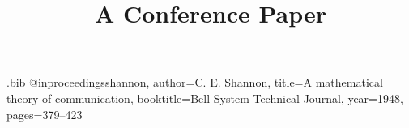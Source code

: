 \begin{filecontents*}[overwrite]{\jobname.bib}
@inproceedings{shannon, author={C. E. Shannon}, title={A mathematical theory of communication},
  booktitle={Bell System Technical Journal}, year={1948}, pages={379--423}}
\end{filecontents*}
\documentclass[conference]{IEEEtran}
\usepackage{cite}
\usepackage{amsmath,amssymb}
\usepackage{algorithmic}
\usepackage{xcolor}

\title{A Conference Paper}
\author{}
\maketitle
\begin{abstract}
A short abstract.
\end{abstract}
\begin{IEEEkeywords}
testing, typesetting
\end{IEEEkeywords}
\section{Introduction}
Information theory~\cite{shannon}: $H = -\sum_i p_i \log p_i$.
\begin{algorithmic}
\STATE $x $
 \STATE $x \gets x + i$ \ENDFOR
\end{algorithmic}



